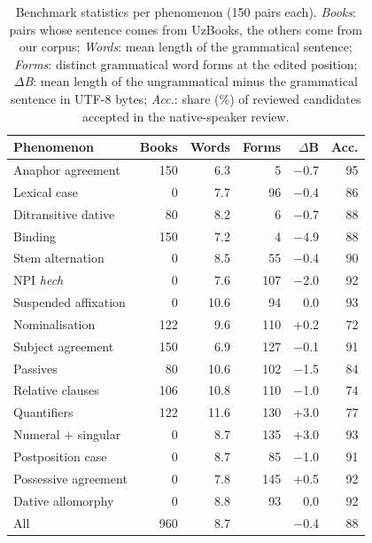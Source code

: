 \begin{table}[t]
\centering\small
\setlength{\tabcolsep}{3.6pt}
\begin{tabular}{@{}lrrrrr@{}}
\toprule
Phenomenon & Books & Words & Forms & $\Delta$B & Acc. \\
\midrule
Anaphor agreement & 150 & 6.3 & 5 & $-$0.7 & 95 \\
Lexical case & 0 & 7.7 & 96 & $-$0.4 & 86 \\
Ditransitive dative & 80 & 8.2 & 6 & $-$0.7 & 88 \\
Binding & 150 & 7.2 & 4 & $-$4.9 & 88 \\
Stem alternation & 0 & 8.5 & 55 & $-$0.4 & 90 \\
NPI \textit{hech} & 0 & 7.6 & 107 & $-$2.0 & 92 \\
Suspended affixation & 0 & 10.6 & 94 & 0.0 & 93 \\
Nominalisation & 122 & 9.6 & 110 & +0.2 & 72 \\
Subject agreement & 150 & 6.9 & 127 & $-$0.1 & 91 \\
Passives & 80 & 10.6 & 102 & $-$1.5 & 84 \\
Relative clauses & 106 & 10.8 & 110 & $-$1.0 & 74 \\
Quantifiers & 122 & 11.6 & 130 & +3.0 & 77 \\
Numeral + singular & 0 & 8.7 & 135 & +3.0 & 93 \\
Postposition case & 0 & 8.7 & 85 & $-$1.0 & 91 \\
Possessive agreement & 0 & 7.8 & 145 & +0.5 & 92 \\
Dative allomorphy & 0 & 8.8 & 93 & 0.0 & 92 \\
\midrule
All & 960 & 8.7 & & $-$0.4 & 88 \\
\bottomrule
\end{tabular}
\caption{Benchmark statistics per phenomenon (150 pairs each). \emph{Books}: pairs whose sentence comes from UzBooks, the others come from our corpus; \emph{Words}: mean length of the grammatical sentence; \emph{Forms}: distinct grammatical word forms at the edited position; $\Delta$\emph{B}: mean length of the ungrammatical minus the grammatical sentence in UTF-8 bytes; \emph{Acc.}: share (\%) of reviewed candidates accepted in the native-speaker review.}
\label{tab:stats}
\end{table}
